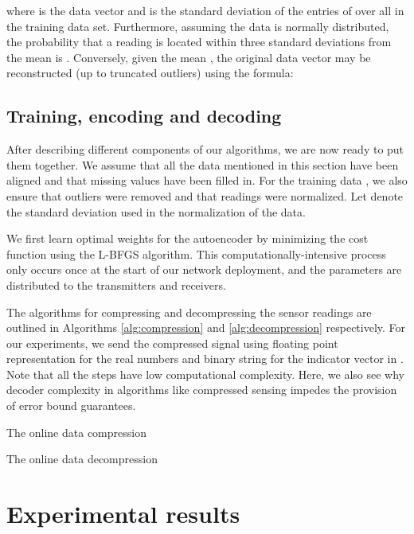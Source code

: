 \documentclass[a4paper,onecolumn,conference]{IEEEtran}
\begin{document}
where  is the data vector and  is the standard deviation of the entries of  over all  in the training data set. Furthermore, assuming the data is normally distributed, the probability that a reading is located within three standard deviations from the mean is . Conversely, given the mean , the original data vector  may be reconstructed (up to truncated outliers) using the formula:


\subsection{Training, encoding and decoding}
After describing different components of our algorithms, we are now ready to put them together. We assume that all the data mentioned in this section have been aligned and that missing values have been filled in. For the training data , we also ensure that outliers were removed and that readings were normalized. Let  denote the standard deviation used in the normalization of the data.

We first learn optimal weights  for the autoencoder by minimizing the cost function  using the L-BFGS algorithm. This computationally-intensive process only occurs once at the start of our network deployment, and the parameters  are distributed to the transmitters and receivers.

The algorithms for compressing and decompressing the sensor readings are outlined in Algorithms \ref{alg:compression} and \ref{alg:decompression} respectively. For our experiments, we send the compressed signal  using floating point representation for the real numbers and binary string for the indicator vector  in . Note that all the steps have low computational complexity. Here, we also see why decoder complexity in algorithms like compressed sensing impedes the provision of error bound guarantees.

\begin{algorithm}
	\DontPrintSemicolon
	\Begin{
	\;
	\;
	\;
	\;
	\;
	\;
	}
\caption{The online data compression \label{alg:compression}}
\end{algorithm}

\begin{algorithm}
	\DontPrintSemicolon
	\Begin{
	\;
	\;
        \;
	\;
	}
\caption{The online data decompression \label{alg:decompression}}
\end{algorithm}

\vfill\eject
\section{Experimental results }\label{sec:experimental}
\end{document}
